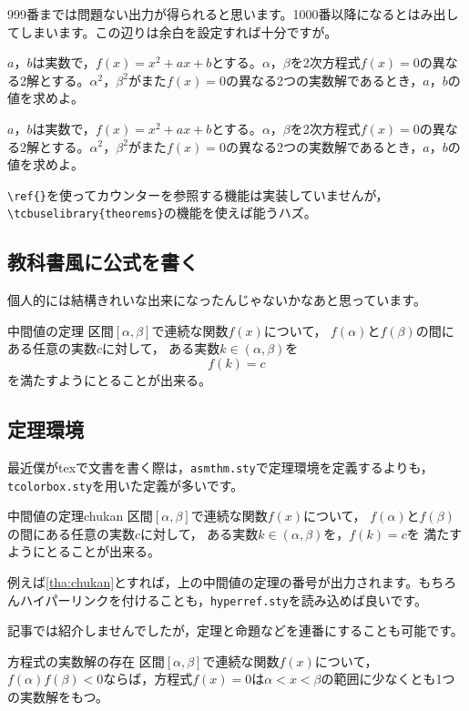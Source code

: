 \documentclass[dvipdfmx]{jsarticle}
\begin{document}
999番までは問題ない出力が得られると思います。1000番以降になるとはみ出してしまいます。この辺りは余白を設定すれば十分ですが。

\setcounter{reidaibangou}{998}
\begin{reidai}
$a$，$b$は実数で，$f(x)=x^2+ax+b$とする。$\alpha$，$\beta$を2次方程式$f(x)=0$の異なる2解とする。$\alpha^2$，$\beta^2$がまた$f(x)=0$の異なる2つの実数解であるとき，$a$，$b$の値を求めよ。
\end{reidai}

\begin{reidai}
$a$，$b$は実数で，$f(x)=x^2+ax+b$とする。$\alpha$，$\beta$を2次方程式$f(x)=0$の異なる2解とする。$\alpha^2$，$\beta^2$がまた$f(x)=0$の異なる2つの実数解であるとき，$a$，$b$の値を求めよ。
\end{reidai}
\verb|\ref{}|を使ってカウンターを参照する機能は実装していませんが，\verb|\tcbuselibrary{theorems}|の機能を使えば能うハズ。

\subsection{教科書風に公式を書く}

個人的には結構きれいな出来になったんじゃないかなあと思っています。

\begin{kousiki}{中間値の定理}
区間$[\alpha,\beta]$で連続な関数$f(x)$について，
$f(\alpha)$と$f(\beta)$の間にある任意の実数$c$に対して，
ある実数$k\in (\alpha,\beta)$を\[
f(k)=c
\]
を満たすようにとることが出来る。
\end{kousiki}

\subsection{定理環境}
最近僕がtexで文書を書く際は，\verb|asmthm.sty|で定理環境を定義するよりも，\verb|tcolorbox.sty|を用いた定義が多いです。
\begin{mytheo}{中間値の定理}{chukan}
区間$[\alpha,\beta]$で連続な関数$f(x)$について，
$f(\alpha)$と$f(\beta)$の間にある任意の実数$c$に対して，
ある実数$k\in (\alpha,\beta)$を，$f(k)=c$を
満たすようにとることが出来る。
\end{mytheo}
例えば\ref{tha:chukan}とすれば，上の中間値の定理の番号が出力されます。もちろんハイパーリンクを付けることも，\verb|hyperref.sty|を読み込めば良いです。

記事では紹介しませんでしたが，定理と命題などを連番にすることも可能です。


\begin{myprop}{方程式の実数解の存在}{}
区間$[\alpha,\beta]$で連続な関数$f(x)$について，
$f(\alpha)f(\beta)<0$ならば，方程式$f(x)=0$は$\alpha<x<\beta$の範囲に少なくとも1つの実数解をもつ。
\end{myprop}
\end{document}

